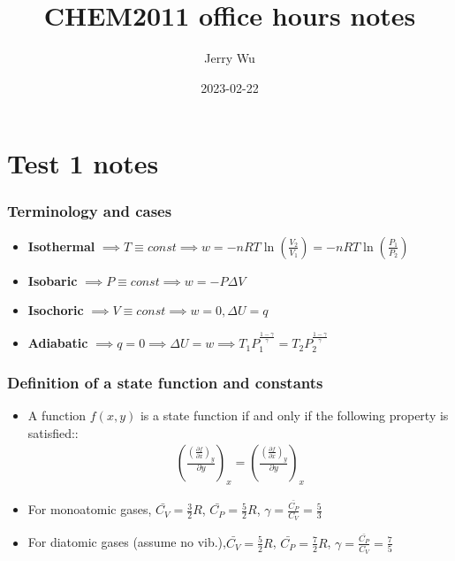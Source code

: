 \documentclass[12pt]{book}
\title{CHEM2011 office hours notes}
\author{Jerry Wu}
\date{2023-02-22}
\begin{document}
\maketitle
\chapter*{Test 1 notes}

\subsection*{Terminology and cases}

\begin{itemize}
    \item \textbf{Isothermal} $\implies T\equiv const\implies w=-nRT\ln(\frac{V_2}{V_1})=-nRT\ln(\frac{P_1}{P_2})$
    \item \textbf{Isobaric} $\implies P\equiv const\implies w=-P\Delta V$
    \item \textbf{Isochoric} $\implies V\equiv const\implies w=0,\Delta U=q$
    \item \textbf{Adiabatic} $\implies q=0\implies \Delta U=w\implies T_1P_1^{\frac{1-\gamma}{\gamma}}=T_2P_2^{\frac{1-\gamma}{\gamma}}$
\end{itemize}

\subsection*{Definition of a state function and constants}

\begin{itemize}
    \item A function $f(x,y)$ is a state function if and only if the following property is satisfied::
    \begin{align*}
        \left(\frac{\left(\frac{\partial f}{\partial x}\right)_y}{\partial y}\right)_x=\left(\frac{\left(\frac{\partial f}{\partial x}\right)_y}{\partial y}\right)_x
    \end{align*}
    \item For monoatomic gases, $\bar{C_V}=\frac{3}{2}R$, $\bar{C_P}=\frac{5}{2}R$, $\gamma=\frac{\bar{C_P}}{C_V}=\frac{5}{3}$
    \item For diatomic gases (assume no vib.),$\bar{C_V}=\frac{5}{2}R$, $\bar{C_P}=\frac{7}{2}R$, $\gamma=\frac{\bar{C_P}}{C_V}=\frac{7}{5}$
\end{itemize}
\end{document}
